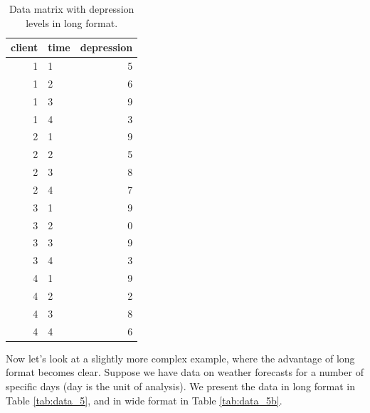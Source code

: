 \documentclass[]{report}\usepackage[]{graphicx}\usepackage[]{color}
\begin{document}
\begin{table}[ht]
\centering
\caption{Data matrix with depression levels in long format.} 
\label{tab:data_8}
\begin{tabular}{rlr}
  \hline
client & time & depression \\ 
  \hline
1 & 1 & 5 \\ 
  1 & 2 & 6 \\ 
  1 & 3 & 9 \\ 
  1 & 4 & 3 \\ 
  2 & 1 & 9 \\ 
  2 & 2 & 5 \\ 
  2 & 3 & 8 \\ 
  2 & 4 & 7 \\ 
  3 & 1 & 9 \\ 
  3 & 2 & 0 \\ 
  3 & 3 & 9 \\ 
  3 & 4 & 3 \\ 
  4 & 1 & 9 \\ 
  4 & 2 & 2 \\ 
  4 & 3 & 8 \\ 
  4 & 4 & 6 \\ 
   \hline
\end{tabular}
\end{table}



Now let's look at a slightly more complex example, where the advantage of long format becomes clear. Suppose we have data on weather forecasts for a number of specific days (day is the unit of analysis). We present the data in long format in Table \ref{tab:data_5}, and in wide format in Table \ref{tab:data_5b}.

\end{document}
